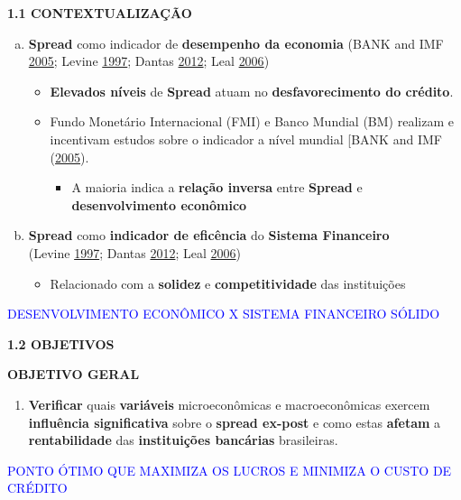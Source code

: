 \documentclass[ignorenonframetext,aspectratio=169,ignorenonframetext]{beamer}
\providecommand{\tightlist}{%
  \setlength{\itemsep}{0pt}\setlength{\parskip}{0pt}}
\begin{document}
\begin{frame}{\textbf{1.1 CONTEXTUALIZAÇÃO}}
\protect\hypertarget{contextualizauxe7uxe3o}{}

\begin{enumerate}
[a.]
\item
  \textbf{Spread} como indicador de \textbf{desempenho da economia}
  (BANK and IMF \protect\hyperlink{ref-WB:2005}{2005}; Levine
  \protect\hyperlink{ref-levine:1997}{1997}; Dantas
  \protect\hyperlink{ref-dantas:2012}{2012}; Leal
  \protect\hyperlink{ref-leal:2006}{2006})

  \begin{itemize}
  \item
    \textbf{Elevados níveis} de \textbf{Spread} atuam no
    \textbf{desfavorecimento do crédito}.
  \item
    Fundo Monetário Internacional (FMI) e Banco Mundial (BM) realizam e
    incentivam estudos sobre o indicador a nível mundial {[}BANK and IMF
    (\protect\hyperlink{ref-WB:2005}{2005}).

    \begin{itemize}
    \tightlist
    \item
      A maioria indica a \textbf{relação inversa} entre \textbf{Spread}
      e \textbf{desenvolvimento econômico}
    \end{itemize}
  \end{itemize}
\item
  \textbf{Spread} como \textbf{indicador de eficência} do
  \textbf{Sistema Financeiro}\\
  (Levine \protect\hyperlink{ref-levine:1997}{1997}; Dantas
  \protect\hyperlink{ref-dantas:2012}{2012}; Leal
  \protect\hyperlink{ref-leal:2006}{2006})

  \begin{itemize}
  \tightlist
  \item
    Relacionado com a \textbf{solidez} e \textbf{competitividade} das
    instituições
  \end{itemize}
\end{enumerate}

\textcolor{blue}{DESENVOLVIMENTO ECONÔMICO X SISTEMA FINANCEIRO SÓLIDO}

\end{frame}

\begin{frame}{\textbf{1.2 OBJETIVOS}}
\protect\hypertarget{objetivos}{}

\textbf{OBJETIVO GERAL}

\begin{enumerate}
\tightlist
\item
  \textbf{Verificar} quais \textbf{variáveis} microeconômicas e
  macroeconômicas exercem \textbf{influência significativa} sobre o
  \textbf{spread ex-post} e como estas \textbf{afetam} a
  \textbf{rentabilidade} das \textbf{instituições bancárias}
  brasileiras.
\end{enumerate}

\textcolor{blue}{PONTO ÓTIMO QUE MAXIMIZA OS LUCROS E MINIMIZA O CUSTO DE CRÉDITO}

\end{frame}
\end{document}
